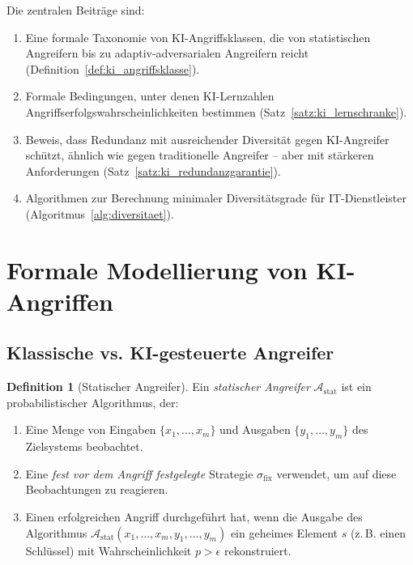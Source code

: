 \documentclass[a4paper,12pt]{article}
\theoremstyle{definition}
\newtheorem{definition}{Definition}
\newcommand{\A}{\mathcal{A}}
\begin{document}
Die zentralen Beiträge sind:

\begin{enumerate}
	\item Eine formale Taxonomie von KI-Angriffsklassen, die von statistischen Angreifern bis zu adaptiv-adversarialen Angreifern reicht (Definition~\ref{def:ki_angriffsklasse}).
	\item Formale Bedingungen, unter denen KI-Lernzahlen Angriffserfolgswahrscheinlichkeiten bestimmen (Satz~\ref{satz:ki_lernschranke}).
	\item Beweis, dass Redundanz mit ausreichender Diversität gegen KI-Angreifer schützt, ähnlich wie gegen traditionelle Angreifer -- aber mit stärkeren Anforderungen (Satz~\ref{satz:ki_redundanzgarantie}).
	\item Algorithmen zur Berechnung minimaler Diversitätsgrade für IT-Dienstleister (Algoritmus~\ref{alg:diversitaet}).
\end{enumerate}

\section{Formale Modellierung von KI-Angriffen}

\subsection{Klassische vs. KI-gesteuerte Angreifer}

\begin{definition}[Statischer Angreifer]
\label{def:statischer_angreifer}
Ein \emph{statischer Angreifer} $\A_{\mathrm{stat}}$ ist ein probabilistischer Algorithmus, der:
\begin{enumerate}
	\item Eine Menge von Eingaben $\{x_1, \ldots, x_m\}$ und Ausgaben $\{y_1, \ldots, y_m\}$ des Zielsystems beobachtet.
	\item Eine \emph{fest vor dem Angriff festgelegte} Strategie $\sigma_{\mathrm{fix}}$ verwendet, um auf diese Beobachtungen zu reagieren.
	\item Einen erfolgreichen Angriff durchgeführt hat, wenn die Ausgabe des Algorithmus $\A_{\mathrm{stat}}(x_1, \ldots, x_m, y_1, \ldots, y_m)$ ein geheimes Element $s$ (z.\,B. einen Schlüssel) mit Wahrscheinlichkeit $p > \epsilon$ rekonstruiert.
\end{enumerate}
\end{definition}
\end{document}
